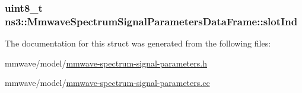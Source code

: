 \subsubsection[{\texorpdfstring{slot\+Ind}{slotInd}}]{\setlength{\rightskip}{0pt plus 5cm}uint8\+\_\+t ns3\+::\+Mmwave\+Spectrum\+Signal\+Parameters\+Data\+Frame\+::slot\+Ind}\hypertarget{structns3_1_1MmwaveSpectrumSignalParametersDataFrame_a717a7f259708ea21c958a840bd576f7b}{}\label{structns3_1_1MmwaveSpectrumSignalParametersDataFrame_a717a7f259708ea21c958a840bd576f7b}


The documentation for this struct was generated from the following files\+:\begin{DoxyCompactItemize}
\item 
mmwave/model/\hyperlink{mmwave-spectrum-signal-parameters_8h}{mmwave-\/spectrum-\/signal-\/parameters.\+h}\item 
mmwave/model/\hyperlink{mmwave-spectrum-signal-parameters_8cc}{mmwave-\/spectrum-\/signal-\/parameters.\+cc}\end{DoxyCompactItemize}
